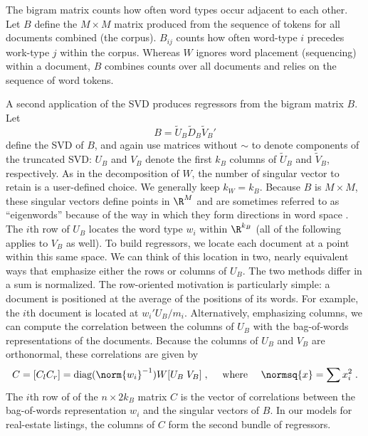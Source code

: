 \documentclass[10pt]{article}
\begin{document}
 The bigram matrix counts how often word types occur adjacent to each other.
  Let $B$ define the $M \times M$ matrix produced from the sequence of tokens
 for all documents combined (the corpus).  $B_{ij}$ counts how often word-type
 $i$ precedes work-type $j$ within the corpus.  Whereas $W$ ignores word
 placement (sequencing) within a document, $B$ combines counts over all documents and relies on the sequence of word tokens.

 
 A second application of the SVD produces regressors from the bigram matrix $B$.
  Let
 \begin{equation}
       B = \tilde{U}_B \tilde{D}_B \tilde{V}_B'
 \label{eq:svdB}
 \end{equation}
 define the SVD of $B$, and again use matrices without $\sim$ to denote components of the truncated SVD:  $U_B$ and $V_B$ denote the first $k_B$ columns of $\tilde{U}_B$ and $\tilde{V}_B$, respectively.  As in the
 decomposition of $W$, the number of singular vector to retain is a user-defined choice.  We generally keep $k_W = k_B$.  Because $B$ is $M
 \times M$, these singular vectors define points in $\R^M$ and are sometimes referred to as ``eigenwords'' because of the way in which they form directions in word space .  The $i$th row of $U_B$  locates the word type $w_i$ within $\R^{k_B}$  (all of the following applies  to $V_B$ as well).  To build regressors, we locate each document at a point within this same space.  We can think of this location in two, nearly equivalent ways that emphasize either the rows or columns of $U_B$.  The two methods differ in a sum is normalized.  The row-oriented motivation is particularly simple: a document is positioned at the average of the positions of its words.  For example, the $i$th document is located at $w_i'U_B/m_i$.  Alternatively, emphasizing columns, we can compute the correlation between the columns of $U_B$ with the bag-of-words representations of the documents.  Because the columns of $U_B$  and $V_B$ are orthonormal, these correlations are given by
 \begin{equation}
     C = [C_l C_r] 
         = \mbox{diag}(\norm{w_i}^{-1})W[U_B \; V_B]   \;, 
            \quad \mbox{ where } \quad  \normsq{x} = \sum x_i^2  \;.
 \label{eq:C}
 \end{equation}
 The $i$th row of of the $n \times 2k_B$ matrix $C$ is the vector of correlations between the bag-of-words representation $w_i$ and the singular vectors of $B$.  In our models for real-estate listings, the columns of $C$ form the second bundle of regressors.
\end{document}
